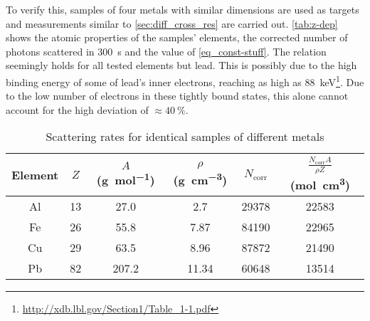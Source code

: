 To verify this, samples of four metals with similar dimensions are used as targets and measurements similar to \autoref{sec:diff_cross_res} are carried out.
\autoref{tab:z-dep} shows the atomic properties of the samples' elements, the corrected number of photons scattered in \SI{300}{\second} and the value of \autoref{eq_const-stuff}.
The relation seemingly holds for all tested elements but lead.
This is possibly due to the high binding energy of some of lead's inner electrons, reaching as high as \SI{88}{\kilo\eV}\footnote{\url{http://xdb.lbl.gov/Section1/Table_1-1.pdf}}.
Due to the low number of electrons in these tightly bound states, this alone cannot account for the high deviation of $\approx \SI{40}{\percent}$.

\begin{table}
	\centering
	\caption{Scattering rates for identical samples of different metals}
	\label{tab:z-dep}
	\begin{tabular}{cS[table-format=2.0]S[table-format=3.1]S[table-format=2.2]S[table-format=5.0]S[table-format=5.0]}
		\toprule
		{Element}&
		{$Z$}&
		{$A$ (\si{\gram\per\mole})}&
		{$\rho$ (\si{\gram\per\cubic\centi\meter})}&
		{$N_\text{corr}$}&
		{$\frac{N_\text{corr} A}{\rho Z}$ (\si{\mole\centi\meter\cubed})}\\
		\midrule
		Al&	13&	27.0&	2.7&	29378&	22583\\
		Fe&	26&	55.8&	7.87&	84190&	22965\\
		Cu&	29&	63.5&	8.96&	87872&	21490\\
		Pb&	82&	207.2&	11.34&	60648&	13514\\
		\bottomrule
	\end{tabular}
\end{table}
